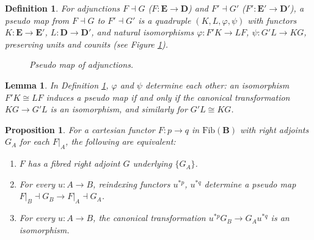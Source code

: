 \documentclass{article}
\theoremstyle{plain}
\newtheorem{lemma}[theorem]{Lemma}
\newtheorem{proposition}[theorem]{Proposition}
\newtheorem{definition}[theorem]{Definition}
\theoremstyle{remark}
\begin{document}
\begin{definition}
\label{def:3.2}
For adjunctions $F \dashv G$ ($F : \mathbf{E} \to \mathbf{D}$) and $F' \dashv G'$ ($F' : \mathbf{E}' \to \mathbf{D}'$), a \emph{pseudo map} from $F \dashv G$ to $F' \dashv G'$ is a quadruple $(K, L, \varphi, \psi)$ with functors $K : \mathbf{E} \to \mathbf{E}'$, $L : \mathbf{D} \to \mathbf{D}'$, and natural isomorphisms $\varphi : F' K \to L F$, $\psi : G' L \to K G$, preserving units and counits (see Figure \ref{fig:pseudo-map}).
\begin{figure}[h]
    \centering
    \caption{Pseudo map of adjunctions.}
    \label{fig:pseudo-map}
\end{figure}
\end{definition}

\begin{lemma}
\label{lem:3.3}
In Definition \ref{def:3.2}, $\varphi$ and $\psi$ determine each other: an isomorphism $F' K \cong L F$ induces a pseudo map if and only if the canonical transformation $K G \to G' L$ is an isomorphism, and similarly for $G' L \cong K G$.
\end{lemma}

\begin{proposition}
\label{prop:3.4}
For a cartesian functor $F : p \to q$ in $\text{Fib}(\mathbf{B})$ with right adjoints $G_A$ for each $\left.F\right|_A$, the following are equivalent:
\begin{enumerate}
    \item[(i)] $F$ has a fibred right adjoint $G$ underlying $\{ G_A \}$.
    \item[(ii)] For every $u : A \to B$, reindexing functors $u^{*p}$, $u^{*q}$ determine a pseudo map $\left.F\right|_B \dashv G_B \to \left.F\right|_A \dashv G_A$.
    \item[(iii)] For every $u : A \to B$, the canonical transformation $u^{*p} G_B \to G_A u^{*q}$ is an isomorphism.
\end{enumerate}
\end{proposition}
\end{document}

